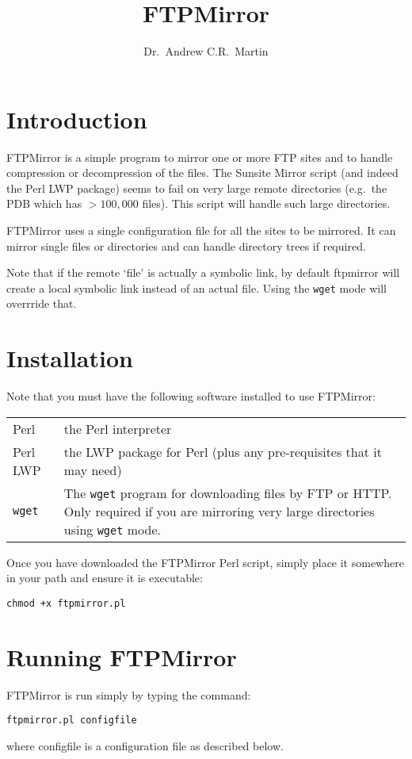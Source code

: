 \documentclass{article}
\title{FTPMirror}
\author{Dr.\ Andrew C.R.\ Martin}
\begin{document}
\maketitle

\section{Introduction}
FTPMirror is a simple program to mirror one or more FTP sites and to
handle compression or decompression of the files. The Sunsite Mirror
script (and indeed the Perl LWP package) seems to fail on very large
remote directories (e.g.\ the PDB which has $>100,000$ files). This script
will handle such large directories.

FTPMirror uses a single configuration file for all the sites to be
mirrored. It can mirror single files or directories and can handle
directory trees if required.

Note that if the remote `file' is actually a symbolic link, by default
ftpmirror will create a local symbolic link instead of an actual
file. Using the \verb|wget| mode will overrride that.

\section{Installation}
Note that you must have the following software installed to use
FTPMirror:

\begin{center}
\begin{tabularx}{\linewidth}{lX}\hline
Perl & the Perl interpreter \\
Perl LWP &  the LWP package for Perl (plus any pre-requisites
that it may need) \\
\verb|wget| &  The \verb|wget| program for downloading files by FTP or
HTTP. Only required if you are mirroring very large directories
using \verb|wget| mode.\\\hline
\end{tabularx}
\end{center}

Once you have downloaded the FTPMirror Perl script, simply place it
somewhere in your path and ensure it is executable:
\begin{verbatim}
chmod +x ftpmirror.pl
\end{verbatim}

\section{Running FTPMirror}
FTPMirror is run simply by typing the command:
\begin{verbatim}
ftpmirror.pl configfile
\end{verbatim}
where configfile is a configuration file as described below.
\vspace{2em}
\end{document}
